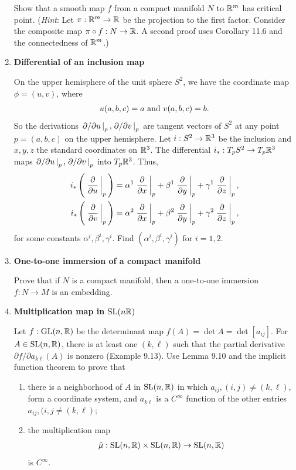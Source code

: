 \documentclass[12pt,a4paper]{report}
\begin{document}
\begin{enumerate}[label=11.\arabic*.]
Show that a smooth map $f$ from a compact manifold $N$ to $\mathbb{R}^m$ has critical point.  (\textit{Hint}: Let $\pi:\mathbb{R}^m \to \mathbb{R}$ be the projection to the first factor.  Consider the composite map $\pi \circ f: N \to \mathbb{R}$.  A second proof uses Corollary 11.6 and the connectedness of $\mathbb{R}^m$.)

\item \textbf{Differential of an inclusion map}

On the upper hemisphere of the unit sphere $S^2$, we have the coordinate map $\phi =(u,v)$, where
\begin{align*}
	u(a,b,c)=a \text{ and } v(a,b,c)=b.
\end{align*}So the derivations $\left . \partial/\partial u \, \right |_p, \left . \partial/\partial v \, \right |_p$ are tangent vectors of $S^2$ at any point $p=(a,b,c)$ on the upper hemisphere.  Let $i: S^2\to \mathbb{R}^3$ be the inclusion and $x,y,z$ the standard coordinates on $\mathbb{R}^3$.  The differential $i_*:T_pS^2\to T_p\mathbb{R}^3$ maps $\left . \partial/\partial u \, \right |_p, \left . \partial/\partial v \, \right |_p$ into $T_p\mathbb{R}^3$.  Thus,
\begin{align*}
	i_*\left (\, \left . \frac{\partial }{\partial u} \, \right |_p \,\right ) &= \alpha^1\left . \frac{\partial }{\partial x} \, \right |_p+\beta^1\left . \frac{\partial }{\partial y} \, \right |_p+\gamma^1\left . \frac{\partial }{\partial z} \, \right |_p,\\
	i_*\left (\, \left . \frac{\partial }{\partial v} \, \right |_p \,\right ) &= \alpha^2\left . \frac{\partial }{\partial x} \, \right |_p+\beta^2\left . \frac{\partial }{\partial y} \, \right |_p+\gamma^2\left . \frac{\partial }{\partial z} \, \right |_p,
\end{align*}for some constants $\alpha^i,\beta^i, \gamma^i$.  Find $(\alpha^i,\beta^i, \gamma^i)$ for $i=1,2$.

\item \textbf{One-to-one immersion of a compact manifold}

Prove that if $N$ is a compact manifold, then a one-to-one immersion $f:N\to M$ is an embedding.

\newcommand{\SL}{\operatorname{SL}}
\newcommand{\GL}{\operatorname{GL}}
\item \textbf{Multiplication map in $\SL(n\R)$}

Let $f: \GL(n,\R)$ be the determinant map $f(A)=\det A=\det[a_{ij}]$.  For $A \in \SL(n,\R)$, there is at least one $(k,\ell)$ such that the partial derivative $\partial f/\partial a_{k\ell}(A)$ is nonzero (Example 9.13).  Use Lemma 9.10 and the implicit function theorem to prove that
\begin{enumerate}
	\item there is a neighborhood of $A$ in $\SL(n,\R)$ in which $a_{ij}, (i,j) \ne (k,\ell)$, form a coordinate system, and $a_{k\ell}$ is a $C^\infty$ function of the other entries $a_{ij},(i,j \ne (k,\ell);$
	\item the multiplication map
	\begin{align*}
		\hat{\mu}: \SL(n,\R)\times \SL(n,\R) \to \SL(n,\R)
	\end{align*}is $C^\infty$.
\end{enumerate}

\end{enumerate}
\end{document}
